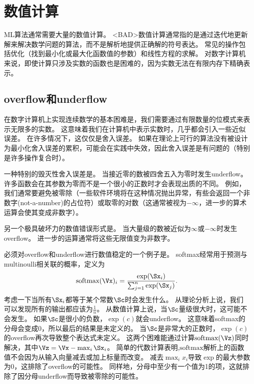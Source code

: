 \chapter{数值计算}
\label{chap:numerical_computation}

\gls{ML}算法通常需要大量的数值计算。
<BAD>数值计算通常指的是通过迭代地更新解来解决数学问题的算法，而不是解析地提供正确解的符号表达。
常见的操作包括优化（找到最小化或最大化函数值的参数）和线性方程的求解。
对数字计算机来说，即使计算只涉及实数的函数也是困难的，因为实数无法在有限内存下精确表示。

\section{\gls{overflow}和\gls{underflow}}
\label{sec:overflow_and_underflow}
在数字计算机上实现连续数学的基本困难是，我们需要通过有限数量的位模式来表示无限多的实数。
这意味着我们在计算机中表示实数时，几乎都会引入一些近似误差。
在许多情况下，这仅仅是舍入误差。
如果在理论上可行的算法没有被设计为最小化舍入误差的累积，可能会在实践中失效，因此舍入误差是有问题的（特别是许多操作复合时）。

一种特别的毁灭性舍入误差是。
当接近零的数被四舍五入为零时发生\gls{underflow}。
许多函数会在其参数为零而不是一个很小的正数时才会表现出质的不同。
例如，我们通常要避免被零除（一些软件环境将在这种情况抛出异常，有些会返回一个非数字(not-a-number)的占位符）或取零的对数（这通常被视为$-\infty$，进一步的算术运算会使其变成非数字）。


另一个极具破坏力的数值错误形式是。
当大量级的数被近似为$\infty$或$-\infty$时发生\gls{overflow}。
进一步的运算通常将这些无限值变为非数字。

必须对\gls{overflow}和\gls{underflow}进行数值稳定的一个例子是。
\gls{softmax}经常用于预测与\gls{multinoulli}相关联的概率，定义为
\begin{align}
 \text{softmax}(\Vx)_i = \frac{\exp(\Sx_i)}{\sum_{j=1}^n \exp(\Sx_j)} .
\end{align}
考虑一下当所有$\Sx_i$都等于某个常数$\Sc$时会发生什么。
从理论分析上说，我们可以发现所有的输出都应该为$\frac{1}{n}$。
从数值计算上说，当$\Sc$量级很大时，这可能不会发生。
如果$\Sc$是很小的负数，$\exp(c)$就会\gls{underflow}。
这意味着\gls{softmax}的分母会变成0，所以最后的结果是未定义的。
当$\Sc$是非常大的正数时，$\exp(c)$的\gls{overflow}再次导致整个表达式未定义。
这两个困难能通过计算$\text{softmax}(\Vz)$同时解决，其中$\Vz = \Vx - \max_i \Sx_i$。
简单的代数计算表明,$\text{softmax}$解析上的函数值不会因为从输入向量减去或加上标量而改变。
减去$\max_i x_i$导致$\exp$的最大参数为$0$，这排除了\gls{overflow}的可能性。
同样地，分母中至少有一个值为1的项，这就排除了因分母\gls{underflow}而导致被零除的可能性。

